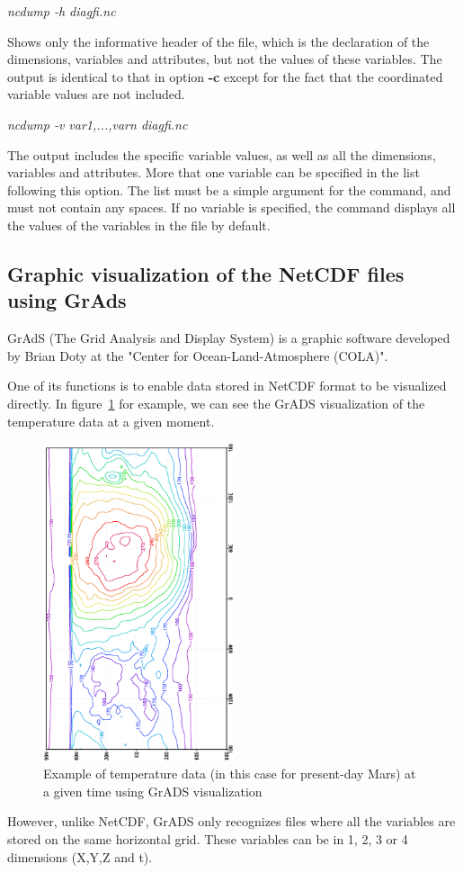 \begin{center}
{\it ncdump -h diagfi.nc}
\end{center}

\noindent
Shows only the informative header of the file, which is the declaration
of the dimensions, variables and attributes, but not the values of these
variables. The output is identical to that in option {\bf -c} except for
the fact that the coordinated variable values are not included.

\begin{center}
{\it ncdump -v var1,...,varn diagfi.nc}
\end{center}

\noindent
The output includes the specific variable values,
as well as all the dimensions, variables and attributes.
More that one variable can be specified in the list following this option.
The list must be a simple argument for the command, and must not contain any
spaces. If no variable is specified, the command displays all the values of
the variables in the file by default.


\subsection{Graphic visualization of the NetCDF files using GrAds}

GrAdS (The Grid Analysis and Display System) is a graphic software developed
by Brian Doty at the "Center for Ocean-Land-Atmosphere (COLA)".

One of its functions is to enable data stored in NetCDF format to be
visualized directly. In figure~\ref{fg:grads} for example, we can see the
GrADS visualization of the temperature data at a given moment.
%
\begin{figure}
\centering
\includegraphics[width=0.5\textwidth,angle=270]{Fig/grads.eps}
\caption{Example of temperature data (in this case for present-day Mars) at a given time using
GrADS visualization\label{fg:grads}}
\end{figure}
%
However, unlike NetCDF, GrADS only recognizes files where all the variables are stored on the same horizontal grid.
These variables can be in 1, 2, 3 or 4 dimensions (X,Y,Z and t).\\

